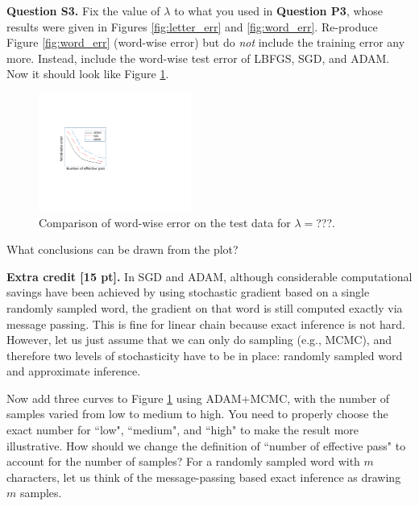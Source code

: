 \documentclass[11pt]{report}
\begin{document}
{\bf Question S3.}
Fix the value of $\lambda$ to what you used in {\bf Question P3},
whose results were given in Figures \ref{fig:letter_err} and \ref{fig:word_err}.
Re-produce Figure \ref{fig:word_err} (word-wise error) but do \emph{not} include the training error any more.
Instead, include the word-wise test error of LBFGS, SGD, and ADAM.
Now it should look like Figure \ref{fig:compare_word_err}.

\begin{figure}[t]
\centering
\includegraphics[width=5cm]{error_sgd}
\caption{Comparison of word-wise error on the test data for $\lambda=$???.}
\label{fig:compare_word_err}
\end{figure}


What conclusions can be drawn from the plot?

{\bf Extra credit [15 pt].} 
In SGD and ADAM, although considerable computational savings have been achieved by using stochastic gradient based on a single randomly sampled word,
the gradient on that word is still computed exactly via message passing.
This is fine for linear chain because exact inference is not hard.
However, let us just assume that we can only do sampling (e.g., MCMC),
and therefore two levels of stochasticity have to be in place: 
randomly sampled word and approximate inference.

Now add three curves to Figure \ref{fig:compare_word_err} using ADAM+MCMC,
with the number of samples varied from low to medium to high.
You need to properly choose the exact number for ``low", ``medium", and ``high" to make the result more illustrative.
How should we change the definition of ``number of effective pass" to account for the number of samples?
For a randomly sampled word with $m$ characters, 
let us think of the message-passing based exact inference as drawing $m$ samples.
\end{document}
